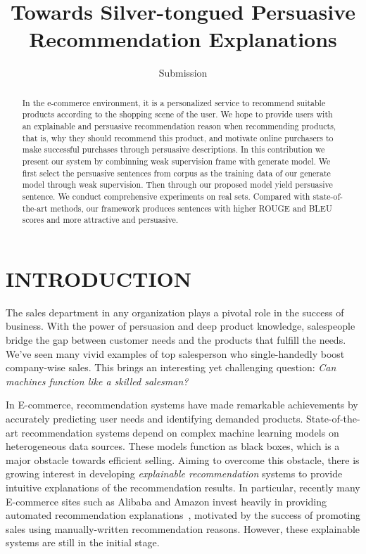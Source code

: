 \documentclass[sigconf]{acmart}
\begin{document}
\title{Towards Silver-tongued Persuasive Recommendation Explanations}

\author{Submission }


\begin{abstract}
In the e-commerce environment, it is a personalized service to recommend suitable products according to the shopping scene of the user. We hope to provide users with an explainable and persuasive recommendation reason when recommending products, that is, why they should recommend this product, and motivate online purchasers to make successful purchases through persuasive descriptions. In this contribution we present our system by combinning weak supervision frame with generate model.  We first select the persuasive sentences from corpus as the training data of our generate model through weak supervision. Then through our proposed model yield persuasive sentence. We conduct comprehensive experiments on real sets. Compared with state-of-the-art methods, our framework produces sentences with higher ROUGE and BLEU scores and more attractive and persuasive.

\end{abstract}



\maketitle

\section{INTRODUCTION}

The sales department in any organization plays a pivotal role in the success of business. 
With the power of persuasion and deep product knowledge, salespeople bridge the gap between customer needs and the products that fulfill the needs. 
We've seen many vivid examples of top salesperson who single-handedly boost company-wise sales.
This brings an interesting yet challenging question: \textit{ Can machines function like a skilled salesman?} 

In E-commerce, recommendation systems have made remarkable achievements by accurately predicting user needs and identifying demanded products. 
State-of-the-art recommendation systems depend on complex machine learning models on heterogeneous data sources. 
These models function as black boxes, which is a major obstacle towards efficient selling. 
Aiming to overcome this obstacle, there is growing interest in developing \textit{explainable recommendation} systems to provide intuitive explanations of the recommendation results. 
In particular, recently many E-commerce sites such as Alibaba and Amazon invest heavily in providing automated recommendation explanations~\cite{Hua2018Shakespeare}, motivated by the success of promoting sales using manually-written recommendation reasons. 
However, these explainable systems are still in the initial stage.
\end{document}
